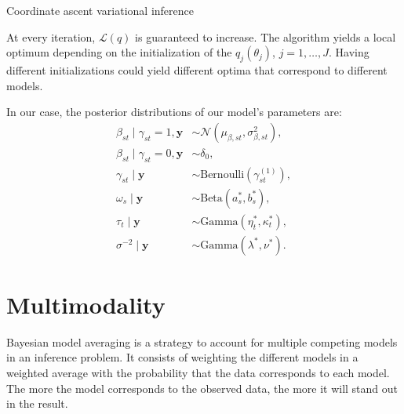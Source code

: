 \documentclass[a4paper, 11pt]{report}
\numberwithin{equation}{section}
\begin{document}
\begin{algorithm}
\BlankLine
{}
\BlankLine
{}
\BlankLine
{}
\caption{Coordinate ascent variational inference \label{algo:CAVI}}
\end{algorithm}
At every iteration, $\mathcal{L}(q)$ is guaranteed to increase. The algorithm yields a local optimum depending on the initialization of the $q_j(\theta_j)$, $j=1,\ldots,J$. Having different initializations could yield different optima that correspond to different models.

In our case, the posterior distributions of our model's parameters are:
\begin{align*}
\beta_{st} \mid \gamma_{st} = 1, \boldsymbol{y} &\sim \mathcal{N}\left(\mu_{\beta, st},\sigma^2_{\beta, st}\right),\\
\beta_{st} \mid \gamma_{st} = 0, \boldsymbol{y} &\sim \delta_0,\\
\gamma_{st} \mid \boldsymbol{y} &\sim \text{Bernoulli}(\gamma_{st}^{(1)}),\\
\omega_s\mid\boldsymbol{y} &\sim \text{Beta}(a_s^*,b_s^*),\\
\tau_t\mid \boldsymbol{y} &\sim \text{Gamma}(\eta^*_t, \kappa^*_t),\\
\sigma^{-2} \mid \boldsymbol{y} &\sim \text{Gamma}(\lambda^*, \nu^*).
\end{align*}

\newpage
\chapter{Multimodality}

Bayesian model averaging is a strategy to account for multiple competing models in an inference problem. It consists of weighting the different models in a weighted average with the probability that the data corresponds to each model. The more the model corresponds to the observed data, the more it will stand out in the result.
\end{document}
